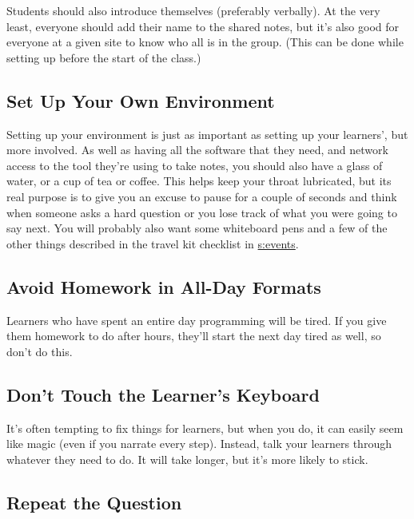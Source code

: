 Students should also introduce themselves (preferably verbally). At the
very least, everyone should add their name to the shared notes, but it's
also good for everyone at a given site to know who all is in the group.
(This can be done while setting up before the start of the class.)

\subsection{Set Up Your Own Environment}\label{set-up-your-own-environment}

Setting up your environment is just as important as setting up your
learners', but more involved. As well as having all the software that
they need, and network access to the tool they're using to take notes,
you should also have a glass of water, or a cup of tea or coffee. This
helps keep your throat lubricated, but its real purpose is to give you
an excuse to pause for a couple of seconds and think when someone asks a
hard question or you lose track of what you were going to say next. You
will probably also want some whiteboard pens and a few of the other
things described in the travel kit checklist in \protect\hyperlink{APPENDIX}{s:events}.

\subsection{Avoid Homework in All-Day Formats}\label{avoid-homework-in-all-day-formats}

Learners who have spent an entire day programming will be tired. If you
give them homework to do after hours, they'll start the next day tired
as well, so don't do this.

\subsection{Don't Touch the Learner's Keyboard}\label{dont-touch-the-learners-keyboard}

It's often tempting to fix things for learners, but when you do, it can
easily seem like magic (even if you narrate every step). Instead, talk
your learners through whatever they need to do. It will take longer, but
it's more likely to stick.

\subsection{Repeat the Question}\label{repeat-the-question}


